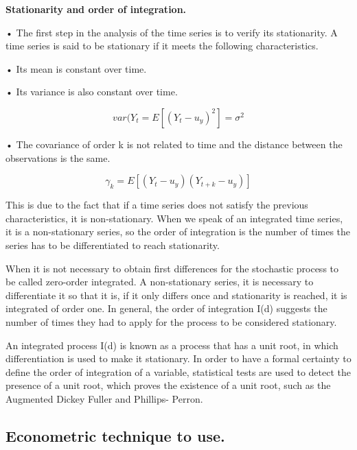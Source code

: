 \documentclass[12pt,english, spanish]{smfart}
\begin{document}
\textbf{Stationarity and order of integration.}\par
•	The first step in the analysis of the time series is to verify its stationarity. A time series is said to be stationary if it meets the following characteristics.\par
•	Its mean is constant over time.\par
•	Its variance is also constant over time.\par

 \begin{equation}
 var(Y_{t} = E[(Y_{t}-u_{y})^2]=	\sigma^2
 \end{equation}
 
•	The covariance of order k is not related to time and the distance between the observations is the same.\par

  \begin{equation}
 \gamma_{k}=E[(Y_{t}-u_{y})(Y_{t+k}-u_{y})]
 \end{equation}
 
This is due to the fact that if a time series does not satisfy the previous characteristics, it is non-stationary. When we speak of an integrated time series, it is a non-stationary series, so the order of integration is the number of times the series has to be differentiated to reach stationarity.\par
When it is not necessary to obtain first differences for the stochastic process to be called zero-order integrated. A non-stationary series, it is necessary to differentiate it so that it is, if it only differs once and stationarity is reached, it is integrated of order one. In general, the order of integration I(d) suggests the number of times they had to apply for the process to be considered stationary.\par
An integrated process I(d) is known as a process that has a unit root, in which differentiation is used to make it stationary. In order to have a formal certainty to define the order of integration of a variable, statistical tests are used to detect the presence of a unit root, which proves the existence of a unit root, such as the Augmented Dickey Fuller and Phillips- Perron.\par


\subsection{Econometric technique to use.}
\end{document}
